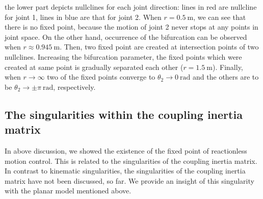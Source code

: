 \documentclass[preprint,12pt]{elsarticle}
\def\unit#1{{~\mathrm{#1}}}
\begin{document}
the lower part depicts nullclines for each joint direction:
lines in red are nullcline for joint 1, lines in blue are that for joint 2. 
When $r = 0.5\unit{m}$,
we can see that there is no fixed point,
because the motion of joint 2 never stops at any points in joint space.
On the other hand,
occurrence of the bifurcation can be observed when $r \approx 0.945\unit{m}$.
Then, two fixed point are created at intersection points of two nullclines.
Increasing the bifurcation parameter,
the fixed points which were created at same point is gradually separated each other
($r = 1.5\unit{m}$).
Finally, when $r \rightarrow \infty$ two of the fixed points converge to
$\theta_{2} \rightarrow 0\unit{rad}$ and
the others are to be $\theta_{2} \rightarrow \pm\pi\unit{rad}$, respectively.




\subsection{The singularities within the coupling inertia matrix}
\label{sec:ANALYSIS_SING}
In above discussion,
we showed the existence of the fixed point of reactionless motion control.
This is related to the singularities of the coupling inertia matrix.
In contrast to kinematic singularities,
the singularities of the coupling inertia matrix have not been discussed, so far.
We provide an insight of this singularity with the planar model mentioned above.
\end{document}
